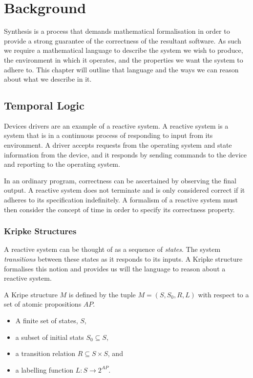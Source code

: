 \chapter{Background}

Synthesis is a process that demands mathematical formalisation in order to
provide a strong guarantee of the correctness of the resultant software. As
such we require a mathematical language to describe the system we wish to
produce, the environment in which it operates, and the properties we want the
system to adhere to. This chapter will outline that language and the ways we
can reason about what we describe in it.

\section{Temporal Logic}

Devices drivers are an example of a reactive system. A reactive system is a
system that is in a continuous process of responding to input from its
environment. A driver accepts requests from the operating system and state
information from the device, and it responds by sending commands to the device
and reporting to the operating system. 

In an ordinary program, correctness can be ascertained by observing the final output. A reactive system does not terminate and is only considered correct if it adheres to its specification indefinitely. A formalism of a reactive system must then consider the concept of time in order to specify its correctness property.

\subsection{Kripke Structures}

A reactive system can be thought of as a sequence of \emph{states}. The system
\emph{transitions} between these states as it responds to its inputs. A Kripke
structure~\cite{Kripke63} formalises this notion and provides us will the
language to reason about a reactive system.

A Kripe structure $M$ is defined by the tuple $M = (S, S_0, R, L)$ with respect
to a set of atomic propositions $AP$.

\begin{itemize}
    \item A finite set of states, $S$,
    \item a subset of initial stats $S_0 \subseteq S$,
    \item a transition relation $R \subseteq S \times S$, and
    \item a labelling function $L : S \to 2^{AP}$.
\end{itemize}

